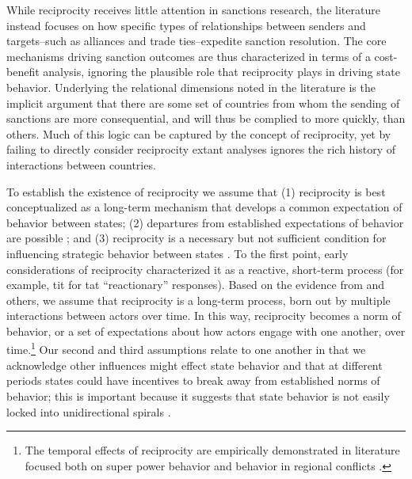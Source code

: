 While reciprocity receives little attention in sanctions research, the literature instead focuses on how specific types of relationships between senders and targets--such as alliances and trade ties--expedite sanction resolution. The core mechanisms driving sanction outcomes are thus characterized in terms of a cost-benefit analysis, ignoring the plausible role that reciprocity plays in driving state behavior. Underlying the relational dimensions noted in the literature is the implicit argument that there are some set of countries from whom the sending of sanctions are more consequential, and will thus be complied to more quickly, than others. Much of this logic can be captured by the concept of reciprocity, yet by failing to directly consider reciprocity extant analyses ignores the rich history of interactions between countries. 

To establish the existence of reciprocity we assume that (1) reciprocity is best conceptualized as a long-term mechanism that develops a common expectation of behavior between states; (2) departures from established expectations of behavior are possible \citep{moore1995}; and (3) reciprocity is a necessary but not sufficient condition for influencing strategic behavior between states \citep{goldstein2001}. To the first point, early considerations of reciprocity characterized it as a reactive, short-term process (for example, tit for tat ``reactionary'' responses). Based on the evidence from \citet{rajmaira:1990} and others, we assume that reciprocity is a long-term process, born out by multiple interactions between actors over time. In this way, reciprocity becomes a norm of behavior, or a set of expectations about how actors engage with one another, over time.\footnote{The temporal effects of reciprocity are empirically demonstrated in literature focused both on super power behavior \citep{rajmaira:1990} and behavior in regional conflicts \citep{goldstein1997}.} Our second and third assumptions relate to one another in that we acknowledge other influences might effect state behavior and that at different periods states could have incentives to break away from established norms of behavior; this is important because it suggests that state behavior is not easily locked into unidirectional spirals \citep{moore1995}.

